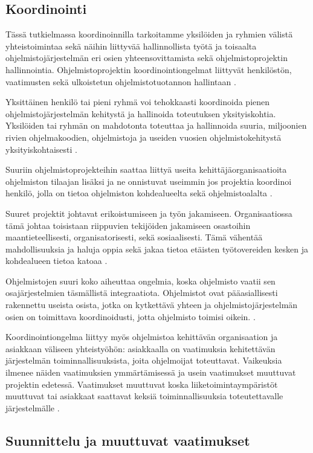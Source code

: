 \documentclass[finnish]{tktltiki2}
\theoremstyle{definition}
\theoremstyle{remark}
\begin{document}
\subsection{Koordinointi}

Tässä tutkielmassa koordinoinnilla tarkoitamme yksilöiden ja ryhmien välistä yhteistoimintaa sekä näihin liittyvää hallinnollista työtä ja toisaalta ohjelmistojärjestelmän eri osien yhteensovittamista sekä ohjelmistoprojektin hallinnointia. Ohjelmistoprojektin koordinointiongelmat liittyvät henkilöstön, vaatimusten sekä ulkoistetun ohjelmistotuotannon hallintaan \cite{KES95}.

Yksittäinen henkilö tai pieni ryhmä voi tehokkaasti koordinoida pienen ohjelmistojärjestelmän kehitystä ja hallinoida toteutuksen yksityiskohtia. Yksilöiden tai ryhmän on mahdotonta toteuttaa ja hallinnoida suuria, miljoonien rivien ohjelmakoodien, ohjelmistoja ja useiden vuosien ohjelmistokehitystä yksityiskohtaisesti \cite{KES95}.

Suuriin ohjelmistoprojekteihin saattaa liittyä useita kehittäjä\-organisaatioita ohjelmiston tilaajan lisäksi ja ne onnistuvat useimmin jos projektia koordinoi henkilö, jolla on tietoa ohjelmiston kohdealueelta sekä ohjelmistoalalta \cite{KES95}.

Suuret projektit johtavat erikoistumiseen ja työn jakamiseen. Organisaatiossa tämä johtaa toisistaan riippuvien tekijöiden jakamiseen osastoihin maantieteellisesti, organisatorisesti, sekä sosiaalisesti. Tämä vähentää mahdollisuuksia ja haluja oppia sekä jakaa tietoa etäisten työtovereiden kesken ja kohdealueen tietoa katoaa \cite{KES95}.

Ohjelmistojen suuri koko aiheuttaa ongelmia, koska ohjelmisto vaatii sen osajärjestelmien täsmällistä integraatiota. Ohjelmistot ovat pääasiallisesti rakennettu useista osista, jotka on kytkettävä yhteen ja ohjelmistojärjestelmän osien on toimittava koordinoidusti, jotta ohjelmisto toimisi oikein. \cite{KES95}.

Koordinointiongelma liittyy myös ohjelmistoa kehittävän organisaation ja asiakkaan väliseen yhteistyöhön: asiakkaalla on vaatimuksia kehitettävän järjestelmän toiminnallisuuksista, joita ohjelmoijat toteuttavat. Vaikeuksia ilmenee näiden vaatimuksien ymmärtämisessä ja usein vaatimukset muuttuvat projektin edetessä. Vaatimukset muuttuvat koska liiketoimintaympäristöt muuttuvat tai asiakkaat saattavat keksiä toiminnallisuuksia toteutettavalle järjestelmälle \cite{FOW01a}.

\subsection{Suunnittelu ja muuttuvat vaatimukset}
\end{document}
